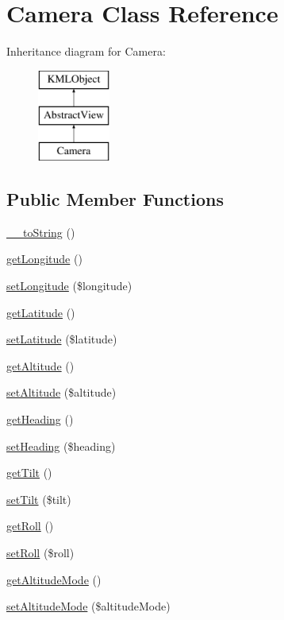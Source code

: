\hypertarget{classCamera}{
\section{Camera Class Reference}
\label{d1/df0/classCamera}
}
Inheritance diagram for Camera:\begin{figure}[H]
\begin{center}
\leavevmode
\includegraphics[height=3.000000cm]{d1/df0/classCamera}
\end{center}
\end{figure}
\subsection*{Public Member Functions}
\begin{DoxyCompactItemize}
\item 
\hyperlink{classCamera_af870b670a7348ffbf9bf7cdb295b5a5e}{\_\-\_\-toString} ()
\item 
\hyperlink{classCamera_a60ea2ce288008f38a983ecd3df7d8bf8}{getLongitude} ()
\item 
\hyperlink{classCamera_ab4dc190d482dc1e850b986aa076e729a}{setLongitude} (\$longitude)
\item 
\hyperlink{classCamera_ab19378e4a42d57320b49e0ba66e4aa68}{getLatitude} ()
\item 
\hyperlink{classCamera_a6fd7e41cdfbda31440f346094b3cfce3}{setLatitude} (\$latitude)
\item 
\hyperlink{classCamera_acc6b92424bb5cbb4345fdc70d5e42f96}{getAltitude} ()
\item 
\hyperlink{classCamera_a643cbfde05c97115227a05724b9d0b96}{setAltitude} (\$altitude)
\item 
\hyperlink{classCamera_a81079b55155c14c8b6cbaf55d1798b74}{getHeading} ()
\item 
\hyperlink{classCamera_a700746462b8778e08f03ad8ac78126c4}{setHeading} (\$heading)
\item 
\hyperlink{classCamera_ac9e126f670d2f0fa8703d42166766c06}{getTilt} ()
\item 
\hyperlink{classCamera_a835dedc174c0957f2e527b2e75e8338e}{setTilt} (\$tilt)
\item 
\hyperlink{classCamera_ad4f8f34cee5443ae4ed15cc0f47f7950}{getRoll} ()
\item 
\hyperlink{classCamera_a79724fcbe8d89659f47a9db7932fa235}{setRoll} (\$roll)
\item 
\hyperlink{classCamera_ae62e069615d5f19e4c7fdede1dc0c760}{getAltitudeMode} ()
\item 
\hyperlink{classCamera_a55219893c849ec02760291957dab90be}{setAltitudeMode} (\$altitudeMode)
\end{DoxyCompactItemize}


